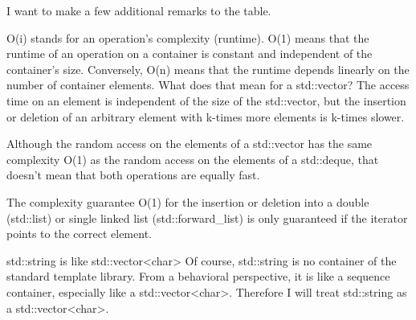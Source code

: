 I want to make a few additional remarks to the table.

O(i) stands for an operation’s complexity (runtime). O(1) means that the runtime of an operation on a container is constant and independent of the container’s size. Conversely, O(n) means that the runtime depends linearly on the number of container elements. What does that mean for a std::vector? The access time on an element is independent of the size of the std::vector, but the insertion or deletion of an arbitrary element with k-times more elements is k-times slower.

Although the random access on the elements of a std::vector has the same complexity O(1) as the random access on the elements of a std::deque, that doesn’t mean that both operations are equally fast.

The complexity guarantee O(1) for the insertion or deletion into a double (std::list) or single linked list (std::forward\_list) is only guaranteed if the iterator points to the correct element.


\begin{myNotic}{std::string is like std::vector<char>}
Of course, std::string is no container of the standard template library. From a behavioral perspective, it is like a sequence container, especially like a std::vector<char>. Therefore I will treat std::string as a std::vector<char>.
\end{myNotic}












